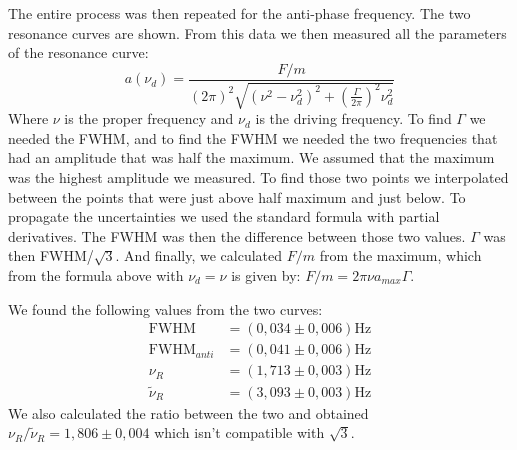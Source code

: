 \documentclass{article}
\begin{document}
The entire process was then repeated for the anti-phase frequency. The two resonance curves are shown. 
From this data we then measured all the parameters of the resonance curve: 
\begin{equation}
    a (\nu_d) = \frac{F/m}{  (2\pi)^2
                \sqrt{( \nu^2 - \nu_d^2 )^2 +
                \left ( \frac{\Gamma}{2\pi} \right )^2 \nu_d^2}}
\end{equation}  
Where $\nu$ is the proper frequency and $\nu_d$ is the driving frequency. To find $\Gamma$ we needed the FWHM, and to find the FWHM we needed the two frequencies that had an amplitude that was half the maximum. We assumed that the maximum was the highest amplitude we measured. To find those two points we interpolated between the points that were just above half maximum and just below. To propagate the uncertainties we used the standard formula with partial derivatives. The FWHM was then the difference between those two values. $\Gamma$ was then FWHM/$\sqrt 3$. And finally, we calculated $F/m$ from the maximum, which from the formula above with $\nu_d = \nu$ is given by: $F/m = 2\pi \nu a_{max} \Gamma$. 

We found the following values from the two curves:
\begin{align}
    \text{FWHM}        &= (0,034 \pm 0,006) \text{Hz}\\
    \text{FWHM}_{anti} &= (0,041 \pm 0,006) \text{Hz}\\
           \nu_R  &= (1,713 \pm 0,003) \text{Hz} \\
    \tilde \nu_R  &= (3,093 \pm 0,003) \text{Hz}
\end{align}
We also calculated the ratio between the two and obtained $ \nu_R / \tilde \nu_R = 1,806 \pm 0,004$ which isn't compatible with $\sqrt 3$.

\end{document}
